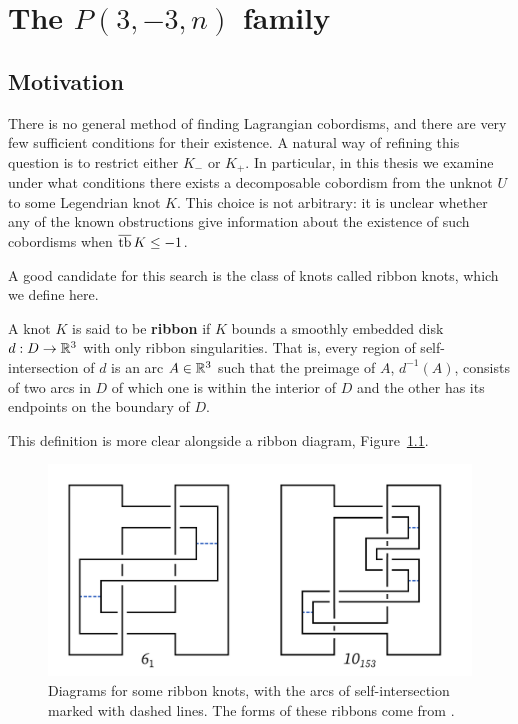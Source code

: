 \chapter{The \texorpdfstring{$P(3, -3, n)$}{P(3, -3, n)} family}\label{ch:pretzel}
\section{Motivation}\label{sec:motivation}
There is no general method of finding Lagrangian cobordisms, and there are very few sufficient conditions for their existence.
A natural way of refining this question is to restrict either $K_-$ or $K_+$.
In particular, in this thesis we examine under what conditions there exists a decomposable cobordism from the unknot $U$ to some Legendrian knot $K$. This choice is not arbitrary: it is unclear whether any of the known obstructions give information about the existence of such cobordisms when $\overline{\operatorname{tb}}\, K \leq -1$.

A good candidate for this search is the class of knots called ribbon knots, which we define here.

\begin{definition}
    A knot $K$ is said to be \textbf{ribbon} if $K$ bounds a smoothly embedded disk $d: D \to \mathbb{R}^3$ with only ribbon singularities.
    That is, every region of self-intersection of $d$ is an arc $A \in \mathbb{R}^3$ such that the preimage of $A$, $d^{-1} (A)$, consists of two arcs in $D$ of which one is within the interior of $D$ and the other has its endpoints on the boundary of $D$.
\end{definition}

This definition is more clear alongside a ribbon diagram, Figure~\ref{fig:ribbons}.

\begin{figure}[ht!]
    \centering
    \includegraphics[width=0.6\linewidth]{images/ribbons.pdf}
    \caption{Diagrams for some ribbon knots, with the arcs of self-intersection marked with dashed lines. The forms of these ribbons come from \cite{kawauchi}.}
    \label{fig:ribbons}
\end{figure}

